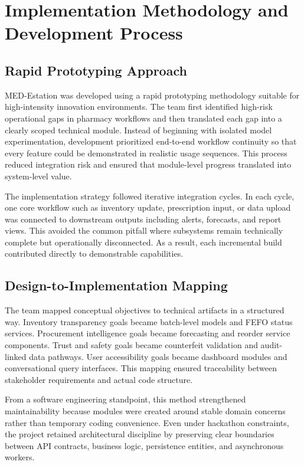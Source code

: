 \documentclass[12pt,a4paper]{article}
\begin{document}
\section{Implementation Methodology and Development Process}
\subsection{Rapid Prototyping Approach}
MED-Estation was developed using a rapid prototyping methodology suitable for high-intensity innovation environments. The team first identified high-risk operational gaps in pharmacy workflows and then translated each gap into a clearly scoped technical module. Instead of beginning with isolated model experimentation, development prioritized end-to-end workflow continuity so that every feature could be demonstrated in realistic usage sequences. This process reduced integration risk and ensured that module-level progress translated into system-level value.

The implementation strategy followed iterative integration cycles. In each cycle, one core workflow such as inventory update, prescription input, or data upload was connected to downstream outputs including alerts, forecasts, and report views. This avoided the common pitfall where subsystems remain technically complete but operationally disconnected. As a result, each incremental build contributed directly to demonstrable capabilities.

\subsection{Design-to-Implementation Mapping}
The team mapped conceptual objectives to technical artifacts in a structured way. Inventory transparency goals became batch-level models and FEFO status services. Procurement intelligence goals became forecasting and reorder service components. Trust and safety goals became counterfeit validation and audit-linked data pathways. User accessibility goals became dashboard modules and conversational query interfaces. This mapping ensured traceability between stakeholder requirements and actual code structure.

From a software engineering standpoint, this method strengthened maintainability because modules were created around stable domain concerns rather than temporary coding convenience. Even under hackathon constraints, the project retained architectural discipline by preserving clear boundaries between API contracts, business logic, persistence entities, and asynchronous workers.
\end{document}
